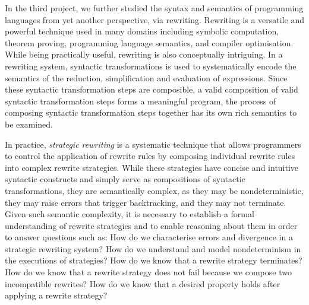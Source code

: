 In the third project, we further studied the syntax and semantics of programming languages from yet another perspective, via rewriting.
Rewriting is a versatile and powerful technique used in many domains including symbolic computation, theorem proving, programming language semantics, and compiler optimisation.
While being practically useful, rewriting is also conceptually intriguing. In a rewriting system, syntactic transformations is used to systematically encode the semantics of the reduction, simplification and evaluation of expressions. Since these syntactic transformation steps are composible, a valid composition of valid syntactic transformation steps forms a meaningful program, the process of composing syntactic transformation steps together has its own rich semantics to be examined. 

In practice, \emph{strategic rewriting} is a systematic technique that allows programmers to control the application of rewrite rules by composing individual rewrite rules into complex rewrite strategies. While these strategies have concise and intuitive syntactic constructs and simply serve as compositions of syntactic transformations, they are semantically complex, as they may be nondeterministic, they may raise errors that trigger backtracking, and they may not terminate.
Given such semantic complexity, it is necessary to establish a formal understanding of rewrite strategies and to enable reasoning about them in order to answer questions such as:
How do we characterise errors and divergence in a strategic rewriting system?
How do we understand and model nondeterminism in the executions of strategies?
How do we know that a rewrite strategy terminates?
How do we know that a rewrite strategy does not fail because we compose two incompatible rewrites?
How do we know that a desired property holds after applying a rewrite strategy?

